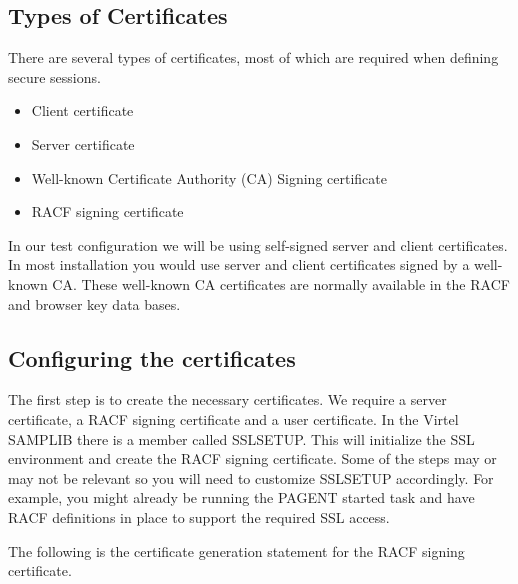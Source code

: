 \documentclass[letterpaper,10pt,english]{sphinxmanual}
\begin{document}
\subsection{Types of Certificates}
\label{\detokenize{TN202002:types-of-certificates}}
There are several types of certificates, most of which are required when defining secure sessions.
\begin{itemize}
\item {} 
Client certificate

\item {} 
Server certificate

\item {} 
Well-known Certificate Authority (CA) Signing certificate

\item {} 
RACF signing certificate

\end{itemize}

In our test configuration we will be using self-signed server and client certificates. In most installation you would use server and client certificates signed by a well-known CA. These well-known CA certificates are normally available in the RACF and browser key data bases.


\subsection{Configuring the certificates}
\label{\detokenize{TN202002:configuring-the-certificates}}
The first step is to create the necessary certificates. We require a server certificate, a RACF signing certificate and a user certificate. In the Virtel SAMPLIB there is a member called SSLSETUP. This will initialize the SSL environment and create the RACF signing certificate. Some of the steps may or may not be relevant so you will need to customize SSLSETUP accordingly. For example, you might already be running the PAGENT started task and have RACF definitions in place to support the required SSL access.

The following is the certificate generation statement for the RACF signing certificate.
\end{document}
